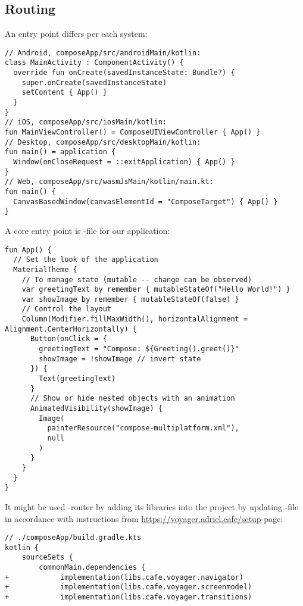 
\subsection{Routing}

An entry point differs per each system:

\begin{lstlisting}
// Android, composeApp/src/androidMain/kotlin:
class MainActivity : ComponentActivity() {
  override fun onCreate(savedInstanceState: Bundle?) {
    super.onCreate(savedInstanceState)
    setContent { App() }
  }
}
// iOS, composeApp/src/iosMain/kotlin:
fun MainViewController() = ComposeUIViewController { App() }
// Desktop, composeApp/src/desktopMain/kotlin:
fun main() = application {
  Window(onCloseRequest = ::exitApplication) { App() }
}
// Web, composeApp/src/wasmJsMain/kotlin/main.kt:
fun main() {
  CanvasBasedWindow(canvasElementId = "ComposeTarget") { App() }
}
\end{lstlisting}

\noindent A core entry point is -file for our application:

\begin{lstlisting}
fun App() {
  // Set the look of the application
  MaterialTheme {
    // To manage state (mutable -- change can be observed)
    var greetingText by remember { mutableStateOf("Hello World!") }
    var showImage by remember { mutableStateOf(false) }
    // Control the layout
    Column(Modifier.fillMaxWidth(), horizontalAlignment = Alignment.CenterHorizontally) {
      Button(onClick = {
        greetingText = "Compose: ${Greeting().greet()}"
        showImage = !showImage // invert state
      }) {
        Text(greetingText)
      }
      // Show or hide nested objects with an animation
      AnimatedVisibility(showImage) {
        Image(
          painterResource("compose-multiplatform.xml"),
          null
        )
      }
    }
  }
}
\end{lstlisting}

It might be used -router by adding its libraries into the project by updating 
-file in accordance with instructions from 
\href{https://voyager.adriel.cafe/setup}{https://voyager.adriel.cafe/setup}-page:

\begin{lstlisting}
// ./composeApp/build.gradle.kts
kotlin {
    sourceSets {
        commonMain.dependencies {
+            implementation(libs.cafe.voyager.navigator)
+            implementation(libs.cafe.voyager.screenmodel)
+            implementation(libs.cafe.voyager.transitions)
\end{lstlisting}

